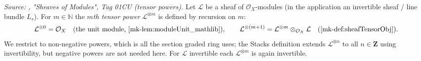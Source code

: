 \begin{definition}\label{mk-def:sheafTensorPow}
  \leanok

  \textit{Source: \cite{stacks-project}, "Sheaves of Modules", Tag 01CU (tensor
  powers).}
  Let \(\mathcal{L}\) be a sheaf of \(\mathcal{O}_X\)-modules (in the application
  an invertible sheaf / line bundle \(L_s\)). For \(m \in \mathbb{N}\) the
  \emph{\(m\)th tensor power} \(\mathcal{L}^{\otimes m}\) is defined by recursion
  on \(m\):
  \[
    \mathcal{L}^{\otimes 0} = \mathcal{O}_X
      \quad(\text{the unit module, \ref{mk-lem:moduleUnit_mathlib}}),
    \qquad
    \mathcal{L}^{\otimes (m+1)}
      = \mathcal{L}^{\otimes m} \otimes_{\mathcal{O}_X} \mathcal{L}
        \quad(\ref{mk-def:sheafTensorObj}).
  \]
  We restrict to non-negative powers, which is all the section graded ring uses;
  the Stacks definition extends \(\mathcal{L}^{\otimes n}\) to all
  \(n \in \mathbf{Z}\) using invertibility, but negative powers are not needed
  here. For \(\mathcal{L}\) invertible each \(\mathcal{L}^{\otimes m}\) is again
  invertible.
\end{definition}


